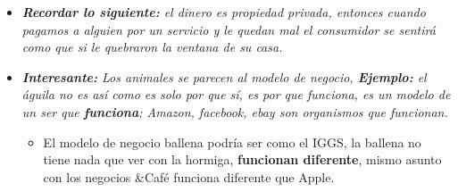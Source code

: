 \begin{itemize}
    \item \emph{\textbf{Recordar lo siguiente: } el dinero es propiedad privada, entonces cuando pagamos a alguien por un servicio y le quedan mal el consumidor se sentirá como que si le quebraron la ventana de su casa.}
    \item \emph{\textbf{Interesante:} Los animales se parecen al modelo de negocio, \emph{\textbf{Ejemplo: }el águila no es así como es solo por que sí, es por que funciona, es un modelo de un ser que \textbf{funciona};  Amazon, facebook, ebay son organismos que funcionan.}} 
        \begin{itemize}
            \item El modelo de negocio ballena podría ser como el IGGS, la ballena no tiene nada que ver con la hormiga, \textbf{funcionan diferente}, mismo asunto con los negocios \&Café funciona diferente que Apple. 
        \end{itemize}
\end{itemize}
